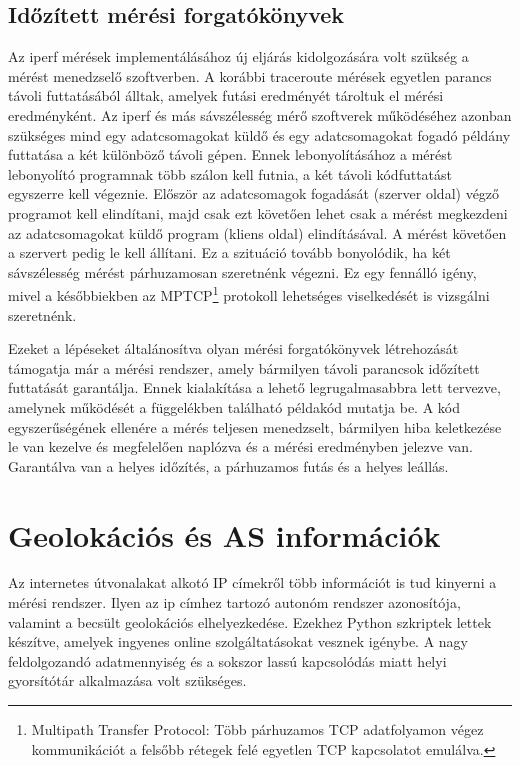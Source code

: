 \subsection{Időzített mérési forgatókönyvek}
Az iperf mérések implementálásához új eljárás kidolgozására volt szükség a mérést menedzselő szoftverben. A korábbi traceroute mérések egyetlen parancs távoli futtatásából álltak, amelyek futási eredményét tároltuk el mérési eredményként. Az iperf és más sávszélesség mérő szoftverek működéséhez azonban szükséges mind egy adatcsomagokat küldő és egy adatcsomagokat fogadó példány futtatása a két különböző távoli gépen. Ennek lebonyolításához a mérést lebonyolító programnak több szálon kell futnia, a két távoli kódfuttatást egyszerre kell végeznie. Először az adatcsomagok fogadását (szerver oldal) végző programot kell elindítani, majd csak ezt követően lehet csak a mérést megkezdeni az adatcsomagokat küldő program (kliens oldal) elindításával. A mérést követően a szervert pedig le kell állítani. Ez a szituáció tovább bonyolódik, ha két sávszélesség mérést párhuzamosan szeretnénk végezni. Ez egy fennálló igény, mivel a későbbiekben az MPTCP\footnote{Multipath Transfer Protocol: Több párhuzamos TCP adatfolyamon végez kommunikációt a felsőbb rétegek felé egyetlen TCP kapcsolatot emulálva.} protokoll lehetséges viselkedését is vizsgálni szeretnénk.

Ezeket a lépéseket általánosítva olyan mérési forgatókönyvek létrehozását támogatja már a mérési rendszer, amely bármilyen távoli parancsok időzített futtatását garantálja. Ennek kialakítása a lehető legrugalmasabbra lett tervezve, amelynek működését a függelékben található példakód mutatja be. A kód egyszerűségének ellenére a mérés teljesen menedzselt, bármilyen hiba keletkezése le van kezelve és megfelelően naplózva és a mérési eredményben jelezve van. Garantálva van a helyes időzítés, a párhuzamos futás és a helyes leállás.



\section{Geolokációs és AS információk}
Az internetes útvonalakat alkotó IP címekről több információt is tud kinyerni a mérési rendszer. Ilyen az ip címhez tartozó autonóm rendszer azonosítója, valamint a becsült geolokációs elhelyezkedése. Ezekhez Python szkriptek lettek készítve, amelyek ingyenes online szolgáltatásokat vesznek igénybe. A nagy feldolgozandó adatmennyiség és a sokszor lassú kapcsolódás miatt helyi gyorsítótár alkalmazása volt szükséges.

